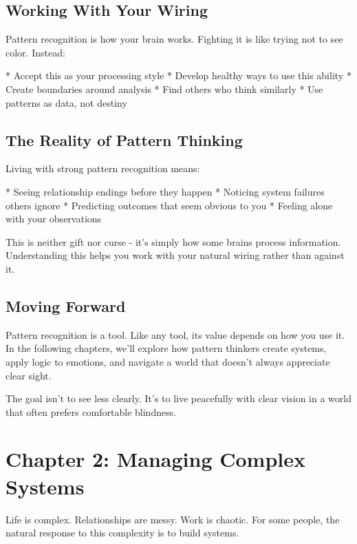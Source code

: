\documentclass[12pt,oneside]{book}
\begin{document}
\section{Working With Your Wiring}

Pattern recognition is how your brain works. Fighting it is like trying not to see color. Instead:

                    * Accept this as your processing style
                    * Develop healthy ways to use this ability
                    * Create boundaries around analysis
                    * Find others who think similarly
                    * Use patterns as data, not destiny

\section{The Reality of Pattern Thinking}

Living with strong pattern recognition means:

                    * Seeing relationship endings before they happen
                    * Noticing system failures others ignore
                    * Predicting outcomes that seem obvious to you
                    * Feeling alone with your observations

This is neither gift nor curse - it's simply how some brains process information. Understanding this helps you work with your natural wiring rather than against it.

\section{Moving Forward}

Pattern recognition is a tool. Like any tool, its value depends on how you use it. In the following chapters, we'll explore how pattern thinkers create systems, apply logic to emotions, and navigate a world that doesn't always appreciate clear sight.

The goal isn't to see less clearly. It's to live peacefully with clear vision in a world that often prefers comfortable blindness.

\chapter{Chapter 2: Managing Complex Systems}

Life is complex. Relationships are messy. Work is chaotic. For some people, the natural response to this complexity is to build systems.
\end{document}
